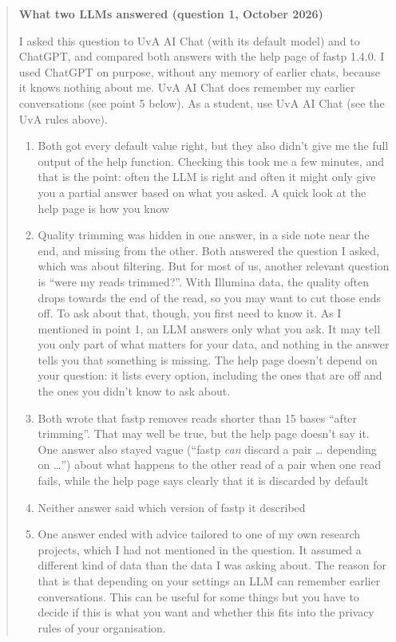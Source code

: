 \documentclass[
  letterpaper,
  DIV=11,
  numbers=noendperiod]{scrreprt}
\providecommand{\tightlist}{%
  \setlength{\itemsep}{0pt}\setlength{\parskip}{0pt}}
\begin{document}
\begin{tcolorbox}
\begin{quote}
\textbf{What two LLMs answered (question 1, October 2026)}

I asked this question to UvA AI Chat (with its default model) and to
ChatGPT, and compared both answers with the help page of fastp 1.4.0. I
used ChatGPT on purpose, without any memory of earlier chats, because it
knows nothing about me. UvA AI Chat does remember my earlier
conversations (see point 5 below). As a student, use UvA AI Chat (see
the UvA rules above).

\begin{enumerate}
\def\labelenumi{\arabic{enumi}.}
\tightlist
\item
  Both got every default value right, but they also didn't give me the
  full output of the help function. Checking this took me a few minutes,
  and that is the point: often the LLM is right and often it might only
  give you a partial answer based on what you asked. A quick look at the
  help page is how you know
\item
  Quality trimming was hidden in one answer, in a side note near the
  end, and missing from the other. Both answered the question I asked,
  which was about filtering. But for most of us, another relevant
  question is ``were my reads trimmed?''. With Illumina data, the
  quality often drops towards the end of the read, so you may want to
  cut those ends off. To ask about that, though, you first need to know
  it. As I mentioned in point 1, an LLM answers only what you ask. It
  may tell you only part of what matters for your data, and nothing in
  the answer tells you that something is missing. The help page doesn't
  depend on your question: it lists every option, including the ones
  that are off and the ones you didn't know to ask about.
\item
  Both wrote that fastp removes reads shorter than 15 bases ``after
  trimming''. That may well be true, but the help page doesn't say it.
  One answer also stayed vague (``fastp \emph{can} discard a pair
  \ldots{} depending on \ldots{}'') about what happens to the other read
  of a pair when one read fails, while the help page says clearly that
  it is discarded by default
\item
  Neither answer said which version of fastp it described
\item
  One answer ended with advice tailored to one of my own research
  projects, which I had not mentioned in the question. It assumed a
  different kind of data than the data I was asking about. The reason
  for that is that depending on your settings an LLM can remember
  earlier conversations. This can be useful for some things but you have
  to decide if this is what you want and whether this fits into the
  privacy rules of your organisation.
\end{enumerate}


\end{quote}
\end{tcolorbox}
\end{document}
